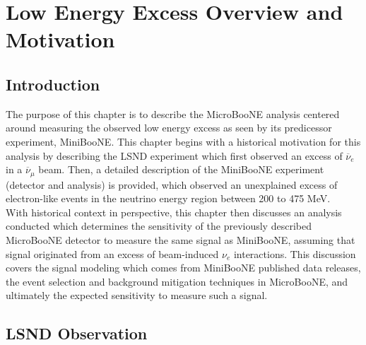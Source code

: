\section{Low Energy Excess Overview and Motivation}
\subsection{Introduction}
The purpose of this chapter is to describe the MicroBooNE analysis centered around measuring the observed low energy excess as seen by its predicessor experiment, MiniBooNE. This chapter begins with a historical motivation for this analysis by describing the LSND experiment which first observed an excess of $\overline{\nu}_e$ in a $\overline{\nu}_\mu$ beam. Then, a detailed description of the MiniBooNE experiment (detector and analysis) is provided, which observed an unexplained excess of electron-like events in the neutrino energy region between 200 to 475 MeV.\\

With historical context in perspective, this chapter then discusses an analysis conducted which determines the sensitivity of the previously described MicroBooNE detector to measure the same signal as MiniBooNE, assuming that signal originated from an excess of beam-induced $\nu_e$ interactions. This discussion covers the signal modeling which comes from MiniBooNE published data releases, the event selection and background mitigation techniques in MicroBooNE, and ultimately the expected sensitivity to measure such a signal.

\subsection{LSND Observation}

